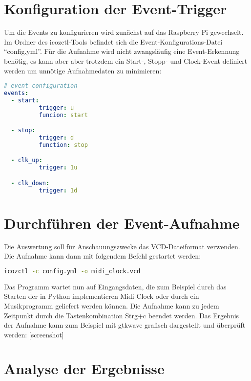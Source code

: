 \section{Konfiguration der Event-Trigger}
\label{ch:Anwendungsfall:sec:Event-Trigger}

Um die Events zu konfigurieren wird zunächst auf das Raspberry Pi gewechselt.  
Im Ordner des icozctl-Tools befindet sich die Event-Konfigurations-Datei ``config.yml''.
Für die Aufnahme wird nicht zwangsläufig eine Event-Erkennung benötig, es kann aber aber trotzdem ein Start-, Stopp- und Clock-Event definiert werden um unnötige Aufnahmedaten zu minimieren:

\begin{lstlisting}[language=yaml]
# event configuration
events: 
  - start:
          trigger: u
          funcion: start

  - stop:
          trigger: d
          function: stop

  - clk_up:
          trigger: 1u

  - clk_down:
          trigger: 1d

\end{lstlisting}


\clearpage


\section{Durchführen der Event-Aufnahme}
\label{ch:Anwendungsfall:sec:Durchführung}

Die Auswertung soll für Anschauungszwecke das VCD-Dateiformat verwenden.
Die Aufnahme kann dann mit folgendem Befehl gestartet werden:
\begin{lstlisting}[language=bash]
icozctl -c config.yml -o midi_clock.vcd
\end{lstlisting}

Das Programm wartet nun auf Eingangsdaten, die zum Beispiel durch das Starten der in Python implementieren Midi-Clock oder durch ein Musikprogramm geliefert werden können.
Die Aufnahme kann zu jedem Zeitpunkt durch die Tastenkombination Strg+c beendet werden.
Das Ergebnis der Aufnahme kann zum Beispiel mit gtkwave grafisch dargestellt und überprüft werden:
[screenshot]

\section{Analyse der Ergebnisse}
\label{ch:Anwendungsfall:sec:Analyse}

